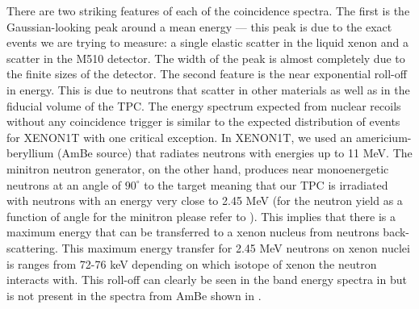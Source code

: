 There are two striking features of each of the coincidence spectra.  The first is the Gaussian-looking peak around a mean energy --- this peak is due to the exact events we are trying to measure: a single elastic scatter in the liquid xenon and a scatter in the M510 detector.  The width of the peak is almost completely due to the finite sizes of the detector.  The second feature is the near exponential roll-off in energy.  This is due to neutrons that scatter in other materials as well as in the fiducial volume of the TPC.  The energy spectrum expected from nuclear recoils without any coincidence trigger is similar to the expected distribution of events for XENON1T with one critical exception.  In XENON1T, we used an americium-beryllium (AmBe source) that radiates neutrons with energies up to 11 MeV.  The minitron neutron generator, on the other hand, produces near monoenergetic neutrons at an angle of $90^{\circ}$ to the target meaning that our TPC is irradiated with neutrons with an energy very close to 2.45 MeV (for the neutron yield as a function of angle for the minitron please refer to ).  This implies that there is a maximum energy that can be transferred to a xenon nucleus from neutrons back-scattering.  This maximum energy transfer for 2.45 MeV neutrons on xenon nuclei is ranges from 72-76 keV depending on which isotope of xenon the neutron interacts with.  This roll-off can clearly be seen in the band energy spectra in  but is not present in the spectra from AmBe shown in .



